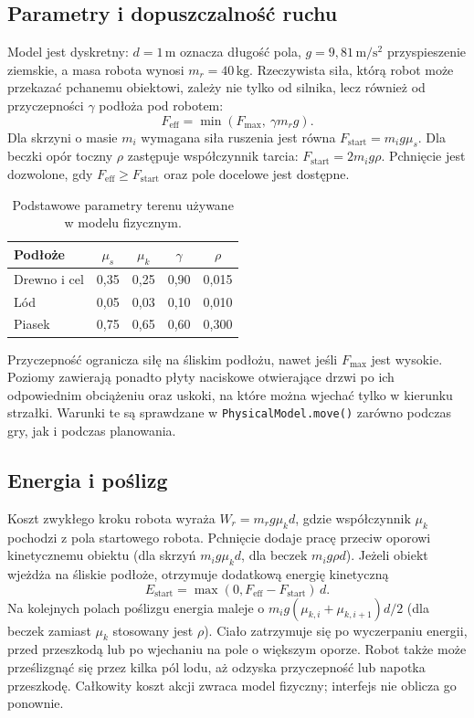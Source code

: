 \documentclass[a4paper,11pt]{article}
\begin{document}
\subsection{Parametry i dopuszczalność ruchu}
Model jest dyskretny: $d=1\,\mathrm{m}$ oznacza długość pola, $g=9{,}81\,\mathrm{m/s^2}$ przyspieszenie ziemskie, a masa robota wynosi $m_r=40\,\mathrm{kg}$. Rzeczywista siła, którą robot może przekazać pchanemu obiektowi, zależy nie tylko od silnika, lecz również od przyczepności $\gamma$ podłoża pod robotem:
\begin{equation}
  F_{\mathrm{eff}}=\min\!\left(F_{\max},\ \gamma m_r g\right).
  \label{eq:force}
\end{equation}
Dla skrzyni o masie $m_i$ wymagana siła ruszenia jest równa $F_{\mathrm{start}}=m_i g\mu_s$. Dla beczki opór toczny $\rho$ zastępuje współczynnik tarcia: $F_{\mathrm{start}}=2m_i g\rho$. Pchnięcie jest dozwolone, gdy $F_{\mathrm{eff}}\geq F_{\mathrm{start}}$ oraz pole docelowe jest dostępne.
\begin{table}[H]
\centering\small
\caption{Podstawowe parametry terenu używane w modelu fizycznym.}
\label{tab:terrain}
\begin{tabular}{@{}lcccc@{}}
\toprule
Podłoże & $\mu_s$ & $\mu_k$ & $\gamma$ & $\rho$ \\
\midrule
Drewno i cel & 0,35 & 0,25 & 0,90 & 0,015 \\
Lód & 0,05 & 0,03 & 0,10 & 0,010 \\
Piasek & 0,75 & 0,65 & 0,60 & 0,300 \\
\bottomrule
\end{tabular}
\end{table}
Przyczepność ogranicza siłę na śliskim podłożu, nawet jeśli $F_{\max}$ jest wysokie. Poziomy zawierają ponadto płyty naciskowe otwierające drzwi po ich odpowiednim obciążeniu oraz uskoki, na które można wjechać tylko w kierunku strzałki. Warunki te są sprawdzane w \texttt{PhysicalModel.move()} zarówno podczas gry, jak i podczas planowania.

\subsection{Energia i poślizg}
Koszt zwykłego kroku robota wyraża $W_r=m_rg\mu_k d$, gdzie współczynnik $\mu_k$ pochodzi z pola startowego robota. Pchnięcie dodaje pracę przeciw oporowi kinetycznemu obiektu (dla skrzyń $m_i g\mu_kd$, dla beczek $m_i g\rho d$). Jeżeli obiekt wjeżdża na śliskie podłoże, otrzymuje dodatkową energię kinetyczną
\begin{equation}
 E_{\mathrm{start}}=\max(0,F_{\mathrm{eff}}-F_{\mathrm{start}})\,d.
\end{equation}
Na kolejnych polach poślizgu energia maleje o $m_i g(\mu_{k,i}+\mu_{k,i+1})d/2$ (dla beczek zamiast $\mu_k$ stosowany jest $\rho$). Ciało zatrzymuje się po wyczerpaniu energii, przed przeszkodą lub po wjechaniu na pole o większym oporze. Robot także może prześlizgnąć się przez kilka pól lodu, aż odzyska przyczepność lub napotka przeszkodę. Całkowity koszt akcji zwraca model fizyczny; interfejs nie oblicza go ponownie.
\end{document}

